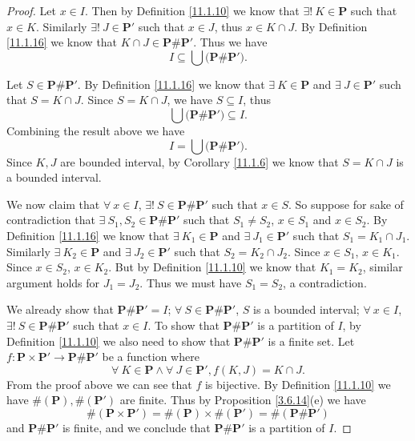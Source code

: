 \begin{proof}
    Let \(x \in I\).
    Then by Definition \ref{11.1.10} we know that \(\exists!\ K \in \mathbf{P}\) such that \(x \in K\).
    Similarly \(\exists!\ J \in \mathbf{P}'\) such that \(x \in J\), thus \(x \in K \cap J\).
    By Definition \ref{11.1.16} we know that \(K \cap J \in \mathbf{P} \# \mathbf{P}'\).
    Thus we have
    \[
        I \subseteq \bigcup \big(\mathbf{P} \# \mathbf{P}'\big).
    \]

    Let \(S \in \mathbf{P} \# \mathbf{P}'\).
    By Definition \ref{11.1.16} we know that \(\exists\ K \in \mathbf{P}\) and \(\exists\ J \in \mathbf{P}'\) such that \(S = K \cap J\).
    Since \(S = K \cap J\), we have \(S \subseteq I\), thus
    \[
        \bigcup \big(\mathbf{P} \# \mathbf{P}'\big) \subseteq I.
    \]
    Combining the result above we have
    \[
        I = \bigcup \big(\mathbf{P} \# \mathbf{P}'\big).
    \]
    Since \(K, J\) are bounded interval, by Corollary \ref{11.1.6} we know that \(S = K \cap J\) is a bounded interval.

    We now claim that \(\forall\ x \in I\), \(\exists!\ S \in \mathbf{P} \# \mathbf{P}'\) such that \(x \in S\).
    So suppose for sake of contradiction that \(\exists\ S_1, S_2 \in \mathbf{P} \# \mathbf{P}'\) such that \(S_1 \neq S_2\), \(x \in S_1\) and \(x \in S_2\).
    By Definition \ref{11.1.16} we know that \(\exists\ K_1 \in \mathbf{P}\) and \(\exists\ J_1 \in \mathbf{P}'\) such that \(S_1 = K_1 \cap J_1\).
    Similarly \(\exists\ K_2 \in \mathbf{P}\) and \(\exists\ J_2 \in \mathbf{P}'\) such that \(S_2 = K_2 \cap J_2\).
    Since \(x \in S_1\), \(x \in K_1\).
    Since \(x \in S_2\), \(x \in K_2\).
    But by Definition \ref{11.1.10} we know that \(K_1 = K_2\), similar argument holds for \(J_1 = J_2\).
    Thus we must have \(S_1 = S_2\), a contradiction.

    We already show that \(\mathbf{P} \# \mathbf{P}' = I\);
    \(\forall\ S \in \mathbf{P} \# \mathbf{P}'\), \(S\) is a bounded interval;
    \(\forall\ x \in I\), \(\exists!\ S \in \mathbf{P} \# \mathbf{P}'\) such that \(x \in I\).
    To show that \(\mathbf{P} \# \mathbf{P}'\) is a partition of \(I\), by Definition \ref{11.1.10} we also need to show that \(\mathbf{P} \# \mathbf{P}'\) is a finite set.
    Let \(f : \mathbf{P} \times \mathbf{P}' \to \mathbf{P} \# \mathbf{P}'\) be a function where
    \[
        \forall\ K \in \mathbf{P} \land \forall\ J \in \mathbf{P}', f(K, J) = K \cap J.
    \]
    From the proof above we can see that \(f\) is bijective.
    By Definition \ref{11.1.10} we have \(\#(\mathbf{P}), \#(\mathbf{P}')\) are finite.
    Thus by Proposition \ref{3.6.14}(e) we have
    \[
        \#(\mathbf{P} \times \mathbf{P}') = \#(\mathbf{P}) \times \#(\mathbf{P}') = \#(\mathbf{P} \# \mathbf{P}')
    \]
    and \(\mathbf{P} \# \mathbf{P}'\) is finite, and we conclude that \(\mathbf{P} \# \mathbf{P}'\) is a partition of \(I\).


\end{proof}
